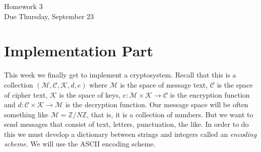 \documentclass[11pt]{article}
\newcommand{\bZ}{\mathbb{Z}}
\newcommand{\cC}{\mathcal{C}}
\newcommand{\cK}{\mathcal{K}}
\newcommand{\cM}{\mathcal{M}}
\begin{document}
\begin{center}
\Large {Homework 3}\\
\small {Due Thursday, September 23}
\end{center}
\section*{Implementation Part}
This week we finally get to implement a cryptosystem.  Recall that this is a collection $(\cM,\cC,\cK,d,e)$ where $\cM$ is the space of message text, $\cC$ is the space of cipher text, $\cK$ is the space of keys, $e:\cM\times\cK\to\cC$ is the encryption function and $d:\cC\times\cK\to\cM$ is the decryption function.  Our message space will be often something like $\cM = \bZ/N\bZ$, that is, it is a collection of numbers.  But we want to send messages that consist of text, letters, punctuation, the like.  In order to do this we must develop a dictionary between strings and integers called an \textit{encoding scheme}.  We will use the ASCII encoding scheme.
\end{document}
